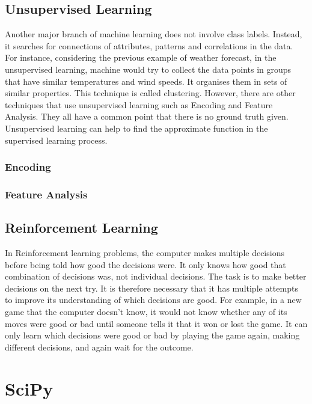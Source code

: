 \documentclass[10pt,a4paper]{article}
\begin{document}
\subsection{Unsupervised Learning}
Another major branch of machine learning does not involve class labels. Instead, it searches for connections of attributes, patterns and correlations in the data. For instance, considering the previous example of weather forecast, in the unsupervised learning, machine would try to collect the data points in groups that have similar temperatures and wind speeds. It organises them in sets of similar properties. This technique is called clustering. However, there are other techniques that use unsupervised learning such as Encoding and Feature Analysis.
They all have a common point that there is no ground truth given. Unsupervised learning can help to find the approximate function in the supervised learning process.

\subsubsection{Encoding}
\subsubsection{Feature Analysis}
\subsection{Reinforcement Learning}
In Reinforcement learning problems, the computer makes multiple decisions before being told how good the decisions were. It only knows how good that combination of decisions was, not individual decisions. The task is to make better decisions on the next try. It is therefore necessary that it has multiple attempts to improve its understanding of which decisions are good. For example, in a new game that the computer doesn't know, it would not know whether any of its moves were good or bad until someone tells it that it won or lost the game. It can only learn which decisions were good or bad by playing the game again, making different decisions, and again wait for the outcome.





\section{SciPy}
\end{document}
